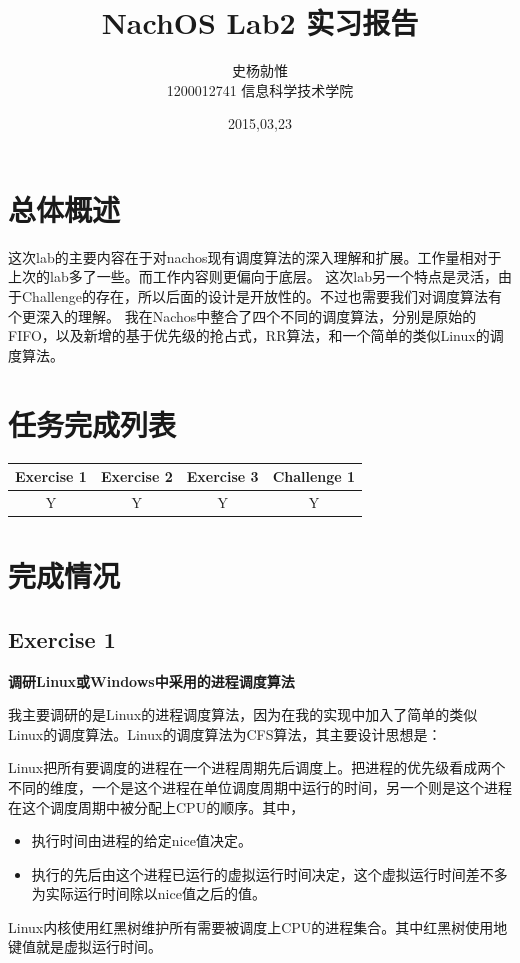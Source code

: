 \documentclass{ctexart}
\begin{document}
\title{%
\vspace{-30mm}\heiti\Huge NachOS Lab2 实习报告 \vspace{10mm}}
\author{%
\Large 史杨勍惟 
\\[10mm] 1200012741 信息科学技术学院}
\date{2015,03,23}

\maketitle

\newpage
\tableofcontents
\newpage

\section{总体概述}
这次lab的主要内容在于对nachos现有调度算法的深入理解和扩展。工作量相对于上次的lab多了一些。而工作内容则更偏向于底层。
这次lab另一个特点是灵活，由于Challenge的存在，所以后面的设计是开放性的。不过也需要我们对调度算法有个更深入的理解。
我在Nachos中整合了四个不同的调度算法，分别是原始的FIFO，以及新增的基于优先级的抢占式，RR算法，和一个简单的类似Linux的调度算法。


\section{任务完成列表}
\begin{table}[h]
\centering
\footnotesize
\begin{tabular}{|c|c|c|c|}\hline
\textbf{Exercise 1} & \textbf{Exercise 2} & \textbf{Exercise 3} & \textbf{Challenge 1} \\\hline
Y & Y & Y & Y \\\hline

\end{tabular}

\end{table}
\section{完成情况}
\subsection*{Exercise 1}
\textbf{调研Linux或Windows中采用的进程调度算法}

我主要调研的是Linux的进程调度算法，因为在我的实现中加入了简单的类似Linux的调度算法。Linux的调度算法为CFS算法，其主要设计思想是：

Linux把所有要调度的进程在一个进程周期先后调度上。把进程的优先级看成两个不同的维度，一个是这个进程在单位调度周期中运行的时间，另一个则是这个进程在这个调度周期中被分配上CPU的顺序。其中，
\begin{itemize}
\item 执行时间由进程的给定nice值决定。
\item 执行的先后由这个进程已运行的虚拟运行时间决定，这个虚拟运行时间差不多为实际运行时间除以nice值之后的值。
\end{itemize}
Linux内核使用红黑树维护所有需要被调度上CPU的进程集合。其中红黑树使用地键值就是虚拟运行时间。
\end{document}
